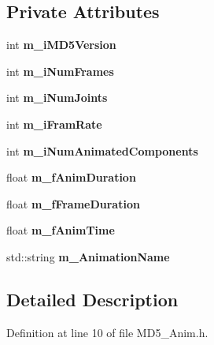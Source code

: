 \subsection*{Private Attributes}
\begin{DoxyCompactItemize}
\item 
int {\bfseries m\+\_\+i\+M\+D5\+Version}\hypertarget{class_m_d5_animation_ab7a550c488f2fe0506c246739cfdf8c7}{}\label{class_m_d5_animation_ab7a550c488f2fe0506c246739cfdf8c7}

\item 
int {\bfseries m\+\_\+i\+Num\+Frames}\hypertarget{class_m_d5_animation_ad3cebc892b485c7c338fcf492c8944ec}{}\label{class_m_d5_animation_ad3cebc892b485c7c338fcf492c8944ec}

\item 
int {\bfseries m\+\_\+i\+Num\+Joints}\hypertarget{class_m_d5_animation_a5e7b52a064927325874e6c331c432cd2}{}\label{class_m_d5_animation_a5e7b52a064927325874e6c331c432cd2}

\item 
int {\bfseries m\+\_\+i\+Fram\+Rate}\hypertarget{class_m_d5_animation_a5d12cabb97cdcddf0865adf5e1084300}{}\label{class_m_d5_animation_a5d12cabb97cdcddf0865adf5e1084300}

\item 
int {\bfseries m\+\_\+i\+Num\+Animated\+Components}\hypertarget{class_m_d5_animation_aa9f816179f3c711878378edbe32a5bfa}{}\label{class_m_d5_animation_aa9f816179f3c711878378edbe32a5bfa}

\item 
float {\bfseries m\+\_\+f\+Anim\+Duration}\hypertarget{class_m_d5_animation_a6dc7fae87e62b8e7ed8d3d52e254806f}{}\label{class_m_d5_animation_a6dc7fae87e62b8e7ed8d3d52e254806f}

\item 
float {\bfseries m\+\_\+f\+Frame\+Duration}\hypertarget{class_m_d5_animation_a68d64478bba383b596d51c130cf15c97}{}\label{class_m_d5_animation_a68d64478bba383b596d51c130cf15c97}

\item 
float {\bfseries m\+\_\+f\+Anim\+Time}\hypertarget{class_m_d5_animation_ae0310e7c463c5800ed18082af261d63d}{}\label{class_m_d5_animation_ae0310e7c463c5800ed18082af261d63d}

\item 
std\+::string {\bfseries m\+\_\+\+Animation\+Name}\hypertarget{class_m_d5_animation_a653d440c11d99febfae6c595920c14f4}{}\label{class_m_d5_animation_a653d440c11d99febfae6c595920c14f4}

\end{DoxyCompactItemize}


\subsection{Detailed Description}


Definition at line 10 of file M\+D5\+\_\+\+Anim.\+h.

